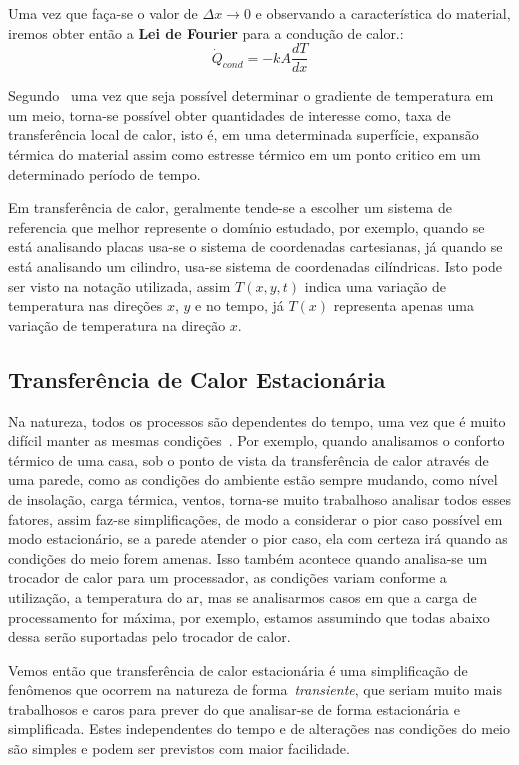 \documentclass[
	12pt,				  %
	openright,		%
	twoside,			%
	a4paper,			%
	chapter=TITLE,		    %
	english,			%
	brazil				%
	]{abntex2}
\begin{document}
Uma vez que faça-se o valor de $\Delta x \to 0$ e observando a característica
do material, iremos obter então a \textbf{Lei de Fourier} para a condução de
calor.:
\begin{equation}
    \dot{Q}_{cond} = -kA\frac{dT}{dx}
\end{equation}

Segundo~ uma vez que seja possível determinar o
gradiente de temperatura em um meio, torna-se possível obter quantidades de
interesse como, taxa de transferência local de calor, isto é, em uma
determinada superfície, expansão térmica do material assim como estresse
térmico em um ponto critico em um determinado período de tempo. 

Em transferência de calor, geralmente tende-se a escolher um sistema de
referencia que melhor represente o domínio estudado, por exemplo, quando se está
analisando placas usa-se o sistema de coordenadas cartesianas, já quando se
está analisando um cilindro, usa-se sistema de coordenadas cilíndricas. Isto
pode ser visto na notação utilizada, assim $T(x,y,t)$ indica uma variação de
temperatura nas direções $x$, $y$ e no tempo, já $T(x)$ representa apenas uma
variação de temperatura na direção $x$. 

\subsection{Transferência de Calor Estacionária}\label{sec:estacionaria}

Na natureza, todos os processos são dependentes do tempo, uma vez que é muito
difícil manter as mesmas condições~\cite{ozisik2012}. Por exemplo, quando
analisamos o conforto térmico de uma casa, sob o ponto de vista da
transferência de calor através de uma parede, como as condições do ambiente
estão sempre mudando, como nível de insolação, carga térmica, ventos, torna-se
muito trabalhoso analisar todos esses fatores, assim faz-se simplificações, de
modo a considerar o pior caso possível em modo estacionário, se a parede
atender o pior caso, ela com certeza irá quando as condições do meio forem
amenas. Isso também acontece quando analisa-se um trocador de calor para um
processador, as condições variam conforme a utilização, a temperatura do ar,
mas se analisarmos casos em que a carga de processamento for máxima, por
exemplo, estamos assumindo que todas abaixo dessa serão suportadas pelo
trocador de calor. 

Vemos então que transferência de calor estacionária é uma simplificação de
fenômenos que ocorrem na natureza de forma~\textit{transiente}, que seriam
muito mais trabalhosos e caros para prever do que analisar-se de forma
estacionária e simplificada. Estes independentes do tempo e de alterações nas
condições do meio são simples e podem ser previstos com maior facilidade.
\end{document}
